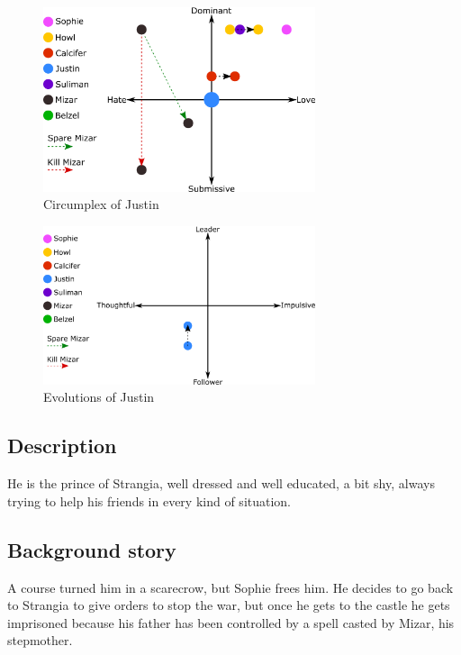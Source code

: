 \begin{figure}[H]
  \centering
  \includegraphics[width=8cm]{Images/SVG/Exported/Circumplexes/justinCircumplex}
  \caption{Circumplex of Justin}
\end{figure}

\begin{figure}[H]
  \centering
   \includegraphics[width=8cm]{Images/SVG/Exported/Evolutions/justinEvolution}
  \caption{Evolutions of Justin}
\end{figure}

\subsection{Description}
He is the prince of Strangia, well dressed and well educated, a bit shy, always trying to help his friends in every kind of situation.

\subsection{Background story}
A course turned him in a scarecrow, but Sophie frees him. He decides to go back to Strangia to give orders to stop the war, but once he gets to the castle he gets imprisoned because his father has been controlled by a spell casted by Mizar, his stepmother.
